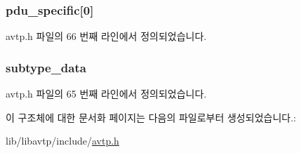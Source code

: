 \subsubsection[{\texorpdfstring{pdu\+\_\+specific}{pdu_specific}}]{ pdu\+\_\+specific\mbox{[}0\mbox{]}}\hypertarget{structavtp__common__pdu_aeb4e59bbf4adbe8ecf7c0d1200134c3f}{}\label{structavtp__common__pdu_aeb4e59bbf4adbe8ecf7c0d1200134c3f}


avtp.\+h 파일의 66 번째 라인에서 정의되었습니다.

\subsubsection[{\texorpdfstring{subtype\+\_\+data}{subtype_data}}]{ subtype\+\_\+data}\hypertarget{structavtp__common__pdu_a3210e9f18fdc9c29cef7600c4d1e67e9}{}\label{structavtp__common__pdu_a3210e9f18fdc9c29cef7600c4d1e67e9}


avtp.\+h 파일의 65 번째 라인에서 정의되었습니다.



이 구조체에 대한 문서화 페이지는 다음의 파일로부터 생성되었습니다.\+:\begin{DoxyCompactItemize}
\item 
lib/libavtp/include/\hyperlink{avtp_8h}{avtp.\+h}\end{DoxyCompactItemize}

